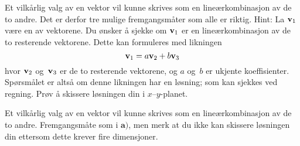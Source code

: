 \begin{losning}
	
\begin{punkt}
Et vilkårlig valg av en vektor vil kunne skrives som en lineærkombinasjon av de to andre. Det er derfor tre mulige fremgangsmåter som alle er riktig.
Hint: La $\mathbf{v}_1$ være en av vektorene. Du ønsker å sjekke om $\mathbf{v}_1$ er en lineærkombinasjon av de to resterende vektorene. Dette kan formuleres med likningen $$\mathbf{v}_1=a\mathbf{v}_2+b\mathbf{v}_3$$ hvor $\mathbf{v}_2$ og~$\mathbf{v}_3$ er de to resterende vektorene, og $a$ og~$b$ er ukjente koeffisienter. Spørsmålet er altså om denne likningen har en løsning; som kan sjekkes ved regning. Prøv å skissere løsningen din i $x$--$y$-planet.
\end{punkt}

\begin{punkt}
Et vilkårlig valg av en vektor vil kunne skrives som en lineærkombinasjon av de to andre. Fremgangsmåte som i $\textbf{a)}$, men merk at du ikke kan skissere løsningen din ettersom dette krever fire dimensjoner. 
\end{punkt}


\end{losning}



